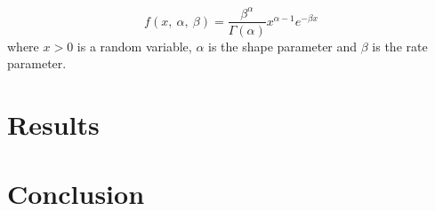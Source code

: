 \documentclass[a4paper]{article}
\begin{document}
\begin{equation}
	f(x,\:\alpha,\:\beta) = \frac{\beta^\alpha}{\Gamma \left(\alpha\right)} x^{\alpha-1} e^{-\beta x}
	\label{equation:gamma-distr}
\end{equation}
\noindent
where $x > 0$ is a random variable, $\alpha$ is the shape parameter and $\beta$ is the rate parameter.




\section{Results}\label{section:results}




\section{Conclusion}\label{section:conclusion}





 
\end{document}
